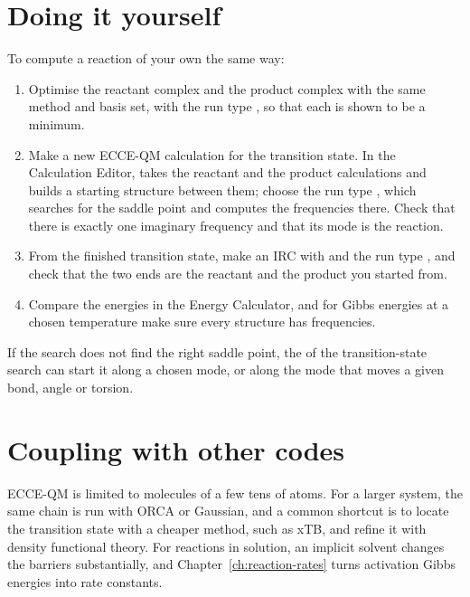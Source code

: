 \section{Doing it yourself}
To compute a reaction of your own the same way:
\begin{enumerate}
	\item Optimise the reactant complex and the product complex with the same method and basis set, with the run type , so that each is shown to be a minimum.
	\item Make a new ECCE-QM calculation for the transition state. In the Calculation Editor,  takes the reactant and the product calculations and builds a starting structure between them; choose the run type , which searches for the saddle point and computes the frequencies there. Check that there is exactly one imaginary frequency and that its mode is the reaction.
	\item From the finished transition state, make an IRC with  and the run type , and check that the two ends are the reactant and the product you started from.
	\item Compare the energies in the Energy Calculator, and for Gibbs energies at a chosen temperature make sure every structure has frequencies.
\end{enumerate}
If the search does not find the right saddle point, the  of the transition-state search can start it along a chosen mode, or along the mode that moves a given bond, angle or torsion.

\section{Coupling with other codes}
ECCE-QM is limited to molecules of a few tens of atoms. For a larger system, the same chain is run with ORCA or Gaussian, and a common shortcut is to locate the transition state with a cheaper method, such as xTB, and refine it with density functional theory. For reactions in solution, an implicit solvent changes the barriers substantially, and Chapter~\ref{ch:reaction-rates} turns activation Gibbs energies into rate constants.
